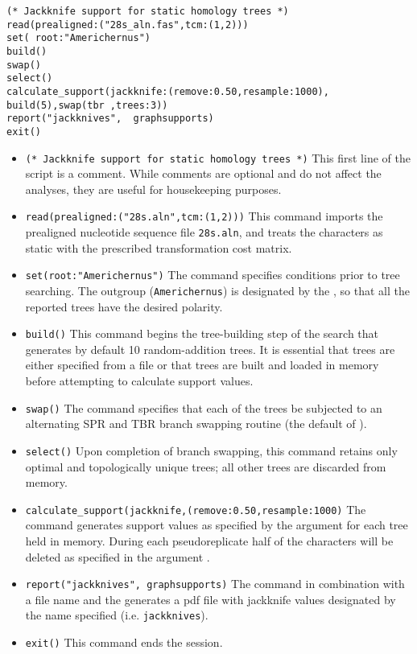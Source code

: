 \begin{verbatim}
(* Jackknife support for static homology trees *)
read(prealigned:("28s_aln.fas",tcm:(1,2)))
set( root:"Americhernus")
build()
swap()
select()
calculate_support(jackknife:(remove:0.50,resample:1000), 
build(5),swap(tbr ,trees:3))
report("jackknives",  graphsupports)
exit()
\end{verbatim}

\begin{itemize}
\item \texttt{(* Jackknife support for static homology trees *)} This first line of the script is a comment. While
 comments are optional and do not affect the analyses, they are useful for housekeeping purposes.
\item \texttt{read(prealigned:("28s.aln",tcm:(1,2)))} This command imports the prealigned nucleotide sequence 
file \texttt{28s.aln}, and treats the characters as static with the prescribed transformation cost matrix.
\item \texttt{set(root:"Americhernus")} The  command specifies conditions prior to tree 
searching. The outgroup (\texttt{Americhernus}) is designated by the , so that all the reported 
trees have the desired polarity.     
\item \texttt{build()} This command begins the tree-building step of the search that generates by default 10 
random-addition trees. It is essential that trees are either specified from a file or that trees are built and loaded in 
memory before attempting to calculate support values.
\item \texttt{swap()} The  command specifies that each of the trees be subjected to an 
alternating SPR and TBR branch swapping routine (the default of \poy).
\item \texttt{select()} Upon completion of branch swapping, this command retains only optimal and topologically 
unique trees; all other trees are discarded from memory. 
\item \texttt{calculate\_support(jackknife,(remove:0.50,resample:1000)} The  
command generates support values as specified by the  argument for each tree held in 
memory. During each pseudoreplicate half of the characters will be deleted as specified in the argument
. 
\item \texttt{report("jackknives",  graphsupports)}  The  command in combination with 
a file name and the  generates a pdf file with jackknife values designated by the 
name specified (i.e. \texttt{jackknives}). 
\item \texttt{exit()} This command ends the \poy session.
\end{itemize}

